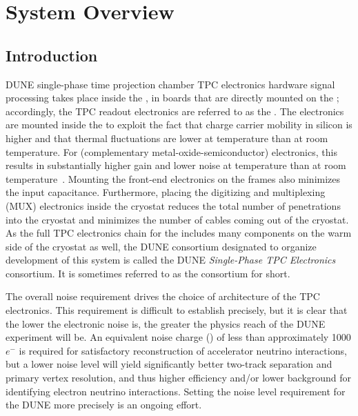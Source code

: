 \section{System Overview}
\label{sec:fdsp-tpcelec-overview}

\subsection{Introduction}
\label{sec:fdsp-tpcelec-overview-intro}


DUNE single-phase time projection chamber TPC electronics hardware signal processing takes place inside the \lar, in boards that are directly mounted on the ; accordingly, the TPC readout electronics are referred to as the .  The electronics are mounted inside the \lar to exploit the fact that charge carrier mobility in silicon is higher and that thermal fluctuations are lower at \lar temperature than at room temperature.  For  (complementary metal-oxide-semiconductor) electronics, this results in substantially higher gain and lower noise at \lar temperature than at room temperature~\cite{larCMOS}.  Mounting the front-end electronics on the  frames also minimizes the input capacitance.  Furthermore, placing the digitizing and multiplexing (MUX) electronics inside the cryostat reduces the total number of penetrations into the cryostat and minimizes the number of cables coming out of the cryostat.  As the full TPC electronics chain for the  includes many components on the warm side of the cryostat as well, the DUNE consortium designated to organize development of this system is called the DUNE \textit{Single-Phase TPC Electronics} consortium. It is sometimes referred to as the  consortium for short.

The overall noise requirement drives the choice of architecture of the TPC electronics. This requirement is difficult to establish precisely, but it is clear that the lower the electronic noise is, the greater the physics reach of the DUNE experiment will be.  An equivalent noise charge () of less than approximately 1000$e^-$ is required for satisfactory reconstruction of accelerator neutrino interactions, but a lower noise level will yield significantly better two-track separation and primary vertex resolution, and thus higher efficiency and/or lower background for identifying electron neutrino interactions.  Setting the noise level requirement for the DUNE  more precisely is an ongoing effort.

